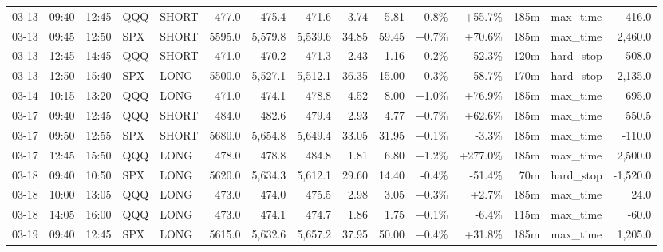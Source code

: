 \documentclass[11pt,a4paper,twoside]{article}
\begin{document}
\begin{landscape}
\begin{center}
\begin{longtable}{>{\color{txtmain}}l l l l l r r r r r r r r >{\color{txtmain}}l r}
03-13 & 09:40 & 12:45 & QQQ & SHORT & 477.0 & 475.4 & 471.6 & 3.74 & 5.81 & \textcolor{wingreen}{+0.8\%} & \textcolor{wingreen}{+55.7\%} & 185m & max\_time & \textcolor{wingreen}{416.0} \\
03-13 & 09:45 & 12:50 & SPX & SHORT & 5595.0 & 5,579.8 & 5,539.6 & 34.85 & 59.45 & \textcolor{wingreen}{+0.7\%} & \textcolor{wingreen}{+70.6\%} & 185m & max\_time & \textcolor{wingreen}{2,460.0} \\
03-13 & 12:45 & 14:45 & QQQ & SHORT & 471.0 & 470.2 & 471.3 & 2.43 & 1.16 & \textcolor{lossred}{-0.2\%} & \textcolor{lossred}{-52.3\%} & 120m & hard\_stop & \textcolor{lossred}{-508.0} \\
03-13 & 12:50 & 15:40 & SPX & LONG & 5500.0 & 5,527.1 & 5,512.1 & 36.35 & 15.00 & \textcolor{lossred}{-0.3\%} & \textcolor{lossred}{-58.7\%} & 170m & hard\_stop & \textcolor{lossred}{-2,135.0} \\
03-14 & 10:15 & 13:20 & QQQ & LONG & 471.0 & 474.1 & 478.8 & 4.52 & 8.00 & \textcolor{wingreen}{+1.0\%} & \textcolor{wingreen}{+76.9\%} & 185m & max\_time & \textcolor{wingreen}{695.0} \\
03-17 & 09:40 & 12:45 & QQQ & SHORT & 484.0 & 482.6 & 479.4 & 2.93 & 4.77 & \textcolor{wingreen}{+0.7\%} & \textcolor{wingreen}{+62.6\%} & 185m & max\_time & \textcolor{wingreen}{550.5} \\
03-17 & 09:50 & 12:55 & SPX & SHORT & 5680.0 & 5,654.8 & 5,649.4 & 33.05 & 31.95 & \textcolor{wingreen}{+0.1\%} & \textcolor{lossred}{-3.3\%} & 185m & max\_time & \textcolor{lossred}{-110.0} \\
03-17 & 12:45 & 15:50 & QQQ & LONG & 478.0 & 478.8 & 484.8 & 1.81 & 6.80 & \textcolor{wingreen}{+1.2\%} & \textcolor{wingreen}{+277.0\%} & 185m & max\_time & \textcolor{wingreen}{2,500.0} \\
03-18 & 09:40 & 10:50 & SPX & LONG & 5620.0 & 5,634.3 & 5,612.1 & 29.60 & 14.40 & \textcolor{lossred}{-0.4\%} & \textcolor{lossred}{-51.4\%} & 70m & hard\_stop & \textcolor{lossred}{-1,520.0} \\
03-18 & 10:00 & 13:05 & QQQ & LONG & 473.0 & 474.0 & 475.5 & 2.98 & 3.05 & \textcolor{wingreen}{+0.3\%} & \textcolor{wingreen}{+2.7\%} & 185m & max\_time & \textcolor{wingreen}{24.0} \\
03-18 & 14:05 & 16:00 & QQQ & LONG & 473.0 & 474.1 & 474.7 & 1.86 & 1.75 & \textcolor{wingreen}{+0.1\%} & \textcolor{lossred}{-6.4\%} & 115m & max\_time & \textcolor{lossred}{-60.0} \\
03-19 & 09:40 & 12:45 & SPX & LONG & 5615.0 & 5,632.6 & 5,657.2 & 37.95 & 50.00 & \textcolor{wingreen}{+0.4\%} & \textcolor{wingreen}{+31.8\%} & 185m & max\_time & \textcolor{wingreen}{1,205.0} \\

\end{longtable}
\end{center}
\end{landscape}
\end{document}
